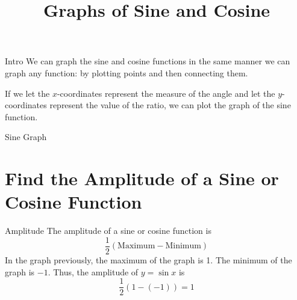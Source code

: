 \documentclass[t,usenames,dvipsnames]{beamer}
\title{Graphs of Sine and Cosine}
\author{}
\date{}
\begin{document}
\maketitle



\begin{frame}{Intro}
We can graph the sine and cosine functions in the same manner we can graph any function: by plotting points and then connecting them.    \newline\\ \pause

If we let the $x$-coordinates represent the measure of the angle and let the $y$-coordinates represent the value of the ratio, we can plot the graph of the sine function.
\end{frame}

\begin{frame}{Sine Graph}
\begin{center}
\end{center}
\end{frame}

\section{Find the Amplitude of a Sine or Cosine Function}

\begin{frame}{Amplitude}
The \alert{amplitude} of a sine or cosine function is 
\[
\frac{1}{2}\left(\text{Maximum} - \text{Minimum}   \right)
\]
\pause
In the graph previously, the maximum of the graph is 1. The minimum of the graph is $-1$. Thus, the amplitude of $y=\sin x$ is
\[
\frac{1}{2}\left(1 - (-1)\right) = 1
\]
\end{frame}
\end{document}
